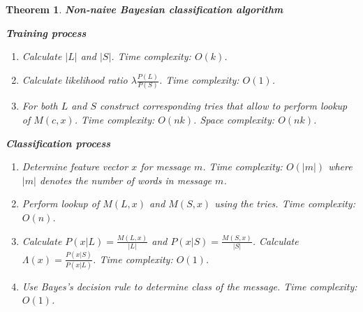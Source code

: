 \documentclass[12pt]{report}
\newtheorem{theorem}{Theorem}[section]
\begin{document}
\begin{theorem}
	\textbf{Non-naive Bayesian classification algorithm}
	
	\textbf{Training process}
	
	\begin{enumerate}
		\item Calculate $|L|$ and $|S|$. Time complexity: $O(k)$.
		\item Calculate likelihood ratio $\lambda \frac{P(L)}{P(S)}$. Time complexity: $O(1)$.
		\item For both $L$ and $S$ construct corresponding tries that allow to perform lookup of $M(c, x)$. Time complexity: $O(nk)$. Space complexity: $O(nk)$.
	\end{enumerate}
	
	\textbf{Classification process}
	
	\begin{enumerate}
		\item Determine feature vector $x$ for message $m$. Time complexity: $O(|m|)$ where $|m|$ denotes the number of words in message $m$.
		\item Perform lookup of $M(L, x)$ and $M(S, x)$ using the tries. Time complexity: $O(n)$.
		\item Calculate $P(x | L) = \frac{M(L, x)}{|L|}$ and $P(x | S) = \frac{M(S, x)}{|S|}$. Calculate $\Lambda(x) = \frac{P(x | S)}{P(x | L)}$. Time complexity: $O(1)$.
		\item Use Bayes's decision rule to determine class of the message. Time complexity: $O(1)$.
	\end{enumerate}
\end{theorem}
\end{document}
